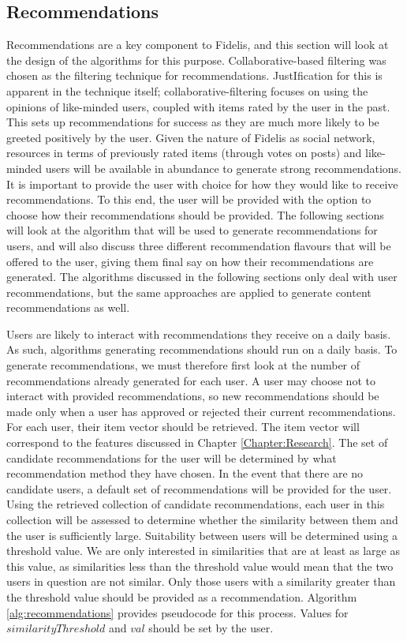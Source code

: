 \subsection{Recommendations}
Recommendations are a key component to Fidelis, and this section will look at the design of the algorithms for this purpose. Collaborative-based filtering was chosen as the filtering technique for recommendations. JustIfication for this is apparent in the technique itself; collaborative-filtering focuses on using the opinions of like-minded users, coupled with items rated by the user in the past. This sets up recommendations for success as they are much more likely to be greeted positively by the user. Given the nature of Fidelis as social network, resources in terms of previously rated items (through votes on posts) and like-minded users will be available in abundance to generate strong recommendations. It is important to provide the user with choice for how they would like to receive recommendations. To this end, the user will be provided with the option to choose how their recommendations should be provided. The following sections will look at the algorithm that will be used to generate recommendations for users, and will also discuss three different recommendation flavours that will be offered to the user, giving them final say on how their recommendations are generated. The algorithms discussed in the following sections only deal with user recommendations, but the same approaches are applied to generate content recommendations as well.

Users are likely to interact with recommendations they receive on a daily basis. As such, algorithms generating recommendations should run on a daily basis. To generate recommendations, we must therefore first look at the number of recommendations already generated for each user. A user may choose not to interact with provided recommendations, so new recommendations should be made only when a user has approved or rejected their current recommendations. For each user, their item vector should be retrieved. The item vector will correspond to the features discussed in Chapter \ref{Chapter:Research}. The set of candidate recommendations for the user will be determined by what recommendation method they have chosen. In the event that there are no candidate users, a default set of recommendations will be provided for the user. Using the retrieved collection of candidate recommendations, each user in this collection will be assessed to determine whether the similarity between them and the user is sufficiently large. Suitability between users will be determined using a threshold value. We are only interested in similarities that are at least as large as this value, as similarities less than the threshold value would mean that the two users in question are not similar. Only those users with a similarity greater than the threshold value should be provided as a recommendation. Algorithm \ref{alg:recommendations} provides pseudocode for this process. Values for $similarityThreshold$ and $val$ should be set by the user.

